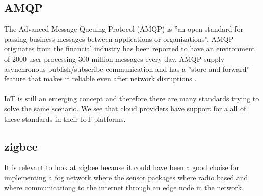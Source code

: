 \documentclass[]{uiophd}
\begin{document}
\subsection{AMQP}
The Advanced Message Queuing Protocol (AMQP) is ''an open standard for passing business messages between applications or organizations''\parencite{amqp}. AMQP originates from the financial industry has been reported to have an environment of 2000 user processing 300 million messages every day. AMQP supply asynchronous publish/subscribe communication and has a ''store-and-forward'' feature that makes it reliable even after network disruptions \parencite{karagiannis2015survey}. 
\\\\
IoT is still an emerging concept and therefore there are many standards trying to solve the same scenario. We see that cloud providers have support for a all of these standards in their IoT platforms.

\subsection{zigbee}
It is relevant to look at zigbee because it could have been a good choise for implementing a fog network where the sensor packages where radio based and where communicationg to the internet through an edge node in the network.
\end{document}
